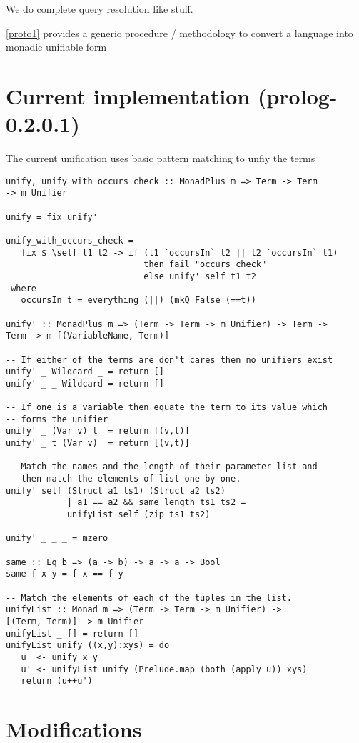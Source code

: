 \documentclass[thesis-solanki.tex]{subfiles}
\begin{document}
We do complete  query resolution like stuff.

\ref{proto1} provides a generic procedure / methodology to convert a language into monadic unifiable form 


\section{Current implementation (prolog-0.2.0.1)}
The current unification uses basic pattern matching to unfiy the terms 


\begin{verbatim}
unify, unify_with_occurs_check :: MonadPlus m => Term -> Term 
-> m Unifier

unify = fix unify'

unify_with_occurs_check =
   fix $ \self t1 t2 -> if (t1 `occursIn` t2 || t2 `occursIn` t1)
                           then fail "occurs check"
                           else unify' self t1 t2
 where
   occursIn t = everything (||) (mkQ False (==t))

unify' :: MonadPlus m => (Term -> Term -> m Unifier) -> Term -> 
Term -> m [(VariableName, Term)]

-- If either of the terms are don't cares then no unifiers exist
unify' _ Wildcard _ = return []
unify' _ _ Wildcard = return []

-- If one is a variable then equate the term to its value which 
-- forms the unifier
unify' _ (Var v) t  = return [(v,t)]
unify' _ t (Var v)  = return [(v,t)]

-- Match the names and the length of their parameter list and 
-- then match the elements of list one by one. 
unify' self (Struct a1 ts1) (Struct a2 ts2) 
            | a1 == a2 && same length ts1 ts2 = 
            unifyList self (zip ts1 ts2)

unify' _ _ _ = mzero

same :: Eq b => (a -> b) -> a -> a -> Bool
same f x y = f x == f y

-- Match the elements of each of the tuples in the list. 
unifyList :: Monad m => (Term -> Term -> m Unifier) -> 
[(Term, Term)] -> m Unifier
unifyList _ [] = return []
unifyList unify ((x,y):xys) = do
   u  <- unify x y
   u' <- unifyList unify (Prelude.map (both (apply u)) xys)
   return (u++u')
\end{verbatim} 


\section{Modifications}
\end{document}

